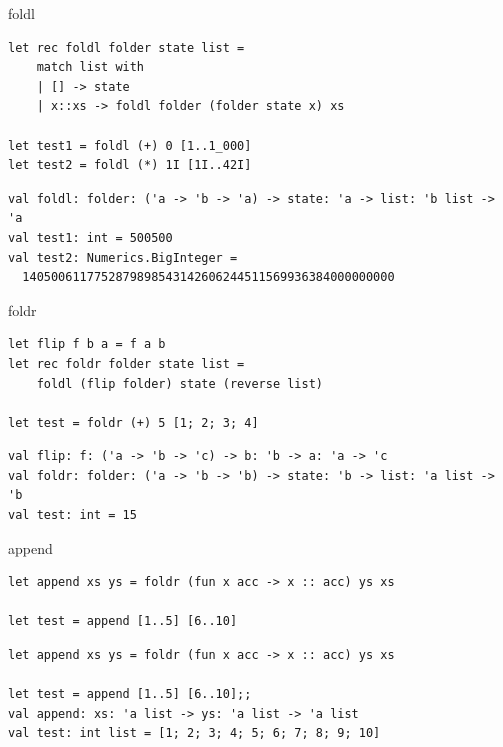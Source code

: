 \documentclass[t]{beamer}
\begin{document}
\begin{frame}[label={sec:org1e266c4},fragile]{foldl}
 \begin{verbatim}
let rec foldl folder state list = 
    match list with
    | [] -> state
    | x::xs -> foldl folder (folder state x) xs

let test1 = foldl (+) 0 [1..1_000]
let test2 = foldl (*) 1I [1I..42I]
\end{verbatim}

\begin{verbatim}
val foldl: folder: ('a -> 'b -> 'a) -> state: 'a -> list: 'b list -> 'a
val test1: int = 500500
val test2: Numerics.BigInteger =
  1405006117752879898543142606244511569936384000000000
\end{verbatim}
\end{frame}

\begin{frame}[label={sec:org9ffefd0},fragile]{foldr}
 \begin{verbatim}
let flip f b a = f a b 
let rec foldr folder state list = 
    foldl (flip folder) state (reverse list)

let test = foldr (+) 5 [1; 2; 3; 4]
\end{verbatim}

\begin{verbatim}
val flip: f: ('a -> 'b -> 'c) -> b: 'b -> a: 'a -> 'c
val foldr: folder: ('a -> 'b -> 'b) -> state: 'b -> list: 'a list -> 'b
val test: int = 15
\end{verbatim}
\end{frame}

\begin{frame}[label={sec:org09be891},fragile]{append}
 \begin{verbatim}
let append xs ys = foldr (fun x acc -> x :: acc) ys xs

let test = append [1..5] [6..10] 
\end{verbatim}

\begin{verbatim}
let append xs ys = foldr (fun x acc -> x :: acc) ys xs

let test = append [1..5] [6..10];;
val append: xs: 'a list -> ys: 'a list -> 'a list
val test: int list = [1; 2; 3; 4; 5; 6; 7; 8; 9; 10]
\end{verbatim}
\end{frame}
\end{document}
